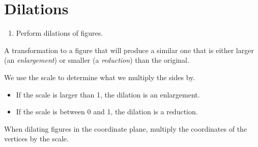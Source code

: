 \documentclass{article}
\begin{document}
\section*{Dilations}

\begin{tcolorbox}[colframe=orange!70!white, coltitle=black, title=\textbf{Today I Can}]
\begin{enumerate}
    \item Perform dilations of figures.
\end{enumerate}
\end{tcolorbox}
\smallskip

\begin{tcolorbox}[colframe=black!20!white, opacitybacktitle=0.1, coltitle=black, title=\textbf{Dilations}]
A transformation to a figure that will produce a similar one that is either larger (an \emph{enlargement}) or smaller (a \emph{reduction}) than the original.
\end{tcolorbox}
\bigskip 

We use the scale to determine what we multiply the sides by.
\begin{itemize}
    \item If the scale is larger than 1, the dilation is an enlargement.
    \item If the scale is between 0 and 1, the dilation is a reduction.
\end{itemize}
\bigskip 

When dilating figures in the coordinate plane, multiply the coordinates of the vertices by the scale. \newline\\
\end{document}
